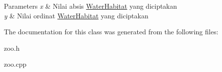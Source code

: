 \begin{DoxyParams}{Parameters}
{\em x} & Nilai absis \hyperlink{classWaterHabitat}{Water\+Habitat} yang diciptakan \\
\hline
{\em y} & Nilai ordinat \hyperlink{classWaterHabitat}{Water\+Habitat} yang diciptakan \\
\hline
\end{DoxyParams}


The documentation for this class was generated from the following files\+:\begin{DoxyCompactItemize}
\item 
zoo.\+h\item 
zoo.\+cpp\end{DoxyCompactItemize}

